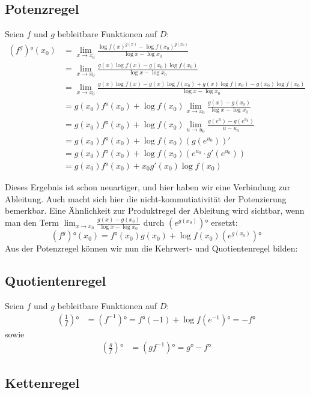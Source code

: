 \documentclass{amsart}
\begin{document}
\subsection{Potenzregel}
Seien $f$ und $g$ bebleitbare Funktionen auf $D$:
\begin{align*}
(f^g)°(x_0) &= \lim_{x\to x_0} \frac{\log f(x)^{g(x)} - \log f(x_0)^{g(x_0)}}{\log x - \log x_0} \\
&= \lim_{x \to x_0} \frac{g(x) \log f(x) - g(x_0) \log f(x_0)}{\log x - \log x_0} \\
&= \lim_{x \to x_0} \frac{g(x) \log f(x) - g(x)\log f(x_0) + g(x)\log f(x_0) - g(x_0) \log f(x_0)}{\log x - \log x_0} \\
&= g(x_0)f°(x_0) + \log f(x_0) \lim_{x \to x_0} \frac{g(x) - g(x_0)}{\log x - \log x_0} \\
&= g(x_0)f°(x_0) + \log f(x_0) \lim_{u \to u_0} \frac{g(e^u) - g(e^{u_0})}{u -u_0} \\
&=g(x_0)f°(x_0) + \log f(x_0)(g(e^{u_0}))' \\
&=g(x_0)f°(x_0) + \log f(x_0)(e^{u_0}\cdot g'(e^{u_0})) \\
&=g(x_0)f°(x_0) + x_0 g'(x_0) \log f(x_0)
\end{align*}

Dieses Ergebnis ist schon neuartiger, und hier haben wir eine Verbindung zur Ableitung. Auch macht sich hier die nicht-kommutiativität der Potenzierung bemerkbar. Eine Ähnlichkeit zur Produktregel der Ableitung wird sichtbar, wenn man den Term $\lim_{x\to x_0} \frac{g(x)-g(x_0)}{\log x - \log x_0}$ durch $(e^{g(x_0)})°$ ersetzt:
\[(f^g)°(x_0) = f°(x_0)g(x_0) + \log f(x_0)(e^{g(x_0)})° \]
Aus der Potenzregel können wir nun die Kehrwert- und Quotientenregel bilden:

\subsection{Quotientenregel}
Seien $f$ und $g$ bebleitbare Funktionen auf $D$:
\begin{align*}
(\frac1f)° &= (f^{-1})° = f°(-1) + \log f (e^{-1})° = -f°
\end{align*}
sowie
\begin{align*}
(\frac gf)° &= (gf^{-1})° = g°-f°
\end{align*}

\subsection{Kettenregel}
\end{document}
